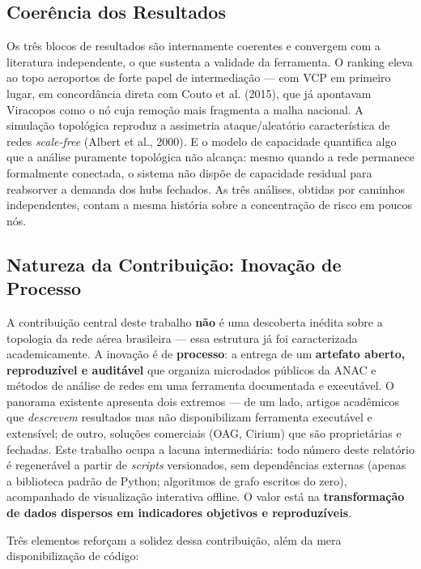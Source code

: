 \documentclass[12pt,a4paper]{article}
\begin{document}
\subsection{Coerência dos Resultados}

Os três blocos de resultados são internamente coerentes e convergem com a literatura independente,
o que sustenta a validade da ferramenta. O ranking eleva ao topo aeroportos de forte papel de
intermediação --- com VCP em primeiro lugar, em concordância direta com Couto et al. (2015), que
já apontavam Viracopos como o nó cuja remoção mais fragmenta a malha nacional. A simulação
topológica reproduz a assimetria ataque/aleatório característica de redes \textit{scale-free}
(Albert et al., 2000). E o modelo de capacidade quantifica algo que a análise puramente
topológica não alcança: mesmo quando a rede permanece formalmente conectada, o sistema não dispõe
de capacidade residual para reabsorver a demanda dos hubs fechados. As três análises, obtidas por
caminhos independentes, contam a mesma história sobre a concentração de risco em poucos nós.

\subsection{Natureza da Contribuição: Inovação de Processo}

A contribuição central deste trabalho \textbf{não} é uma descoberta inédita sobre a topologia da
rede aérea brasileira --- essa estrutura já foi caracterizada academicamente. A inovação é de
\textbf{processo}: a entrega de um \textbf{artefato aberto, reproduzível e auditável} que organiza
microdados públicos da ANAC e métodos de análise de redes em uma ferramenta documentada e
executável. O panorama existente apresenta dois extremos --- de um lado, artigos acadêmicos que
\textit{descrevem} resultados mas não disponibilizam ferramenta executável e extensível; de outro,
soluções comerciais (OAG, Cirium) que são proprietárias e fechadas. Este trabalho ocupa a lacuna
intermediária: todo número deste relatório é regenerável a partir de \textit{scripts} versionados,
sem dependências externas (apenas a biblioteca padrão de Python; algoritmos de grafo escritos do
zero), acompanhado de visualização interativa offline. O valor está na \textbf{transformação de
dados dispersos em indicadores objetivos e reproduzíveis}.

Três elementos reforçam a solidez dessa contribuição, além da mera disponibilização de código:
\end{document}

